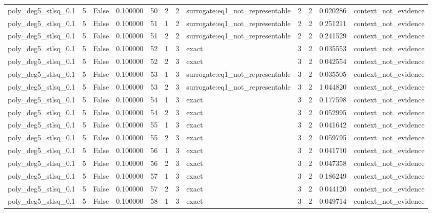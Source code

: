\begin{tabular}{lrrrrrrlrrrl}
poly\_deg5\_stlsq\_0.1 & 5 & False & 0.100000 & 50 & 2 & 2 & surrogate:eq1\_not\_representable & 2 & 2 & 0.020286 & context\_not\_evidence \\
poly\_deg5\_stlsq\_0.1 & 5 & False & 0.100000 & 51 & 1 & 2 & surrogate:eq1\_not\_representable & 2 & 2 & 0.251211 & context\_not\_evidence \\
poly\_deg5\_stlsq\_0.1 & 5 & False & 0.100000 & 51 & 2 & 2 & surrogate:eq1\_not\_representable & 2 & 2 & 0.241529 & context\_not\_evidence \\
poly\_deg5\_stlsq\_0.1 & 5 & False & 0.100000 & 52 & 1 & 3 & exact & 3 & 2 & 0.035553 & context\_not\_evidence \\
poly\_deg5\_stlsq\_0.1 & 5 & False & 0.100000 & 52 & 2 & 3 & exact & 3 & 2 & 0.042554 & context\_not\_evidence \\
poly\_deg5\_stlsq\_0.1 & 5 & False & 0.100000 & 53 & 1 & 3 & surrogate:eq1\_not\_representable & 3 & 2 & 0.035505 & context\_not\_evidence \\
poly\_deg5\_stlsq\_0.1 & 5 & False & 0.100000 & 53 & 2 & 3 & surrogate:eq1\_not\_representable & 3 & 2 & 1.044820 & context\_not\_evidence \\
poly\_deg5\_stlsq\_0.1 & 5 & False & 0.100000 & 54 & 1 & 3 & exact & 3 & 2 & 0.177598 & context\_not\_evidence \\
poly\_deg5\_stlsq\_0.1 & 5 & False & 0.100000 & 54 & 2 & 3 & exact & 3 & 2 & 0.052995 & context\_not\_evidence \\
poly\_deg5\_stlsq\_0.1 & 5 & False & 0.100000 & 55 & 1 & 3 & exact & 3 & 2 & 0.041642 & context\_not\_evidence \\
poly\_deg5\_stlsq\_0.1 & 5 & False & 0.100000 & 55 & 2 & 3 & exact & 3 & 2 & 0.059795 & context\_not\_evidence \\
poly\_deg5\_stlsq\_0.1 & 5 & False & 0.100000 & 56 & 1 & 3 & exact & 3 & 2 & 0.041710 & context\_not\_evidence \\
poly\_deg5\_stlsq\_0.1 & 5 & False & 0.100000 & 56 & 2 & 3 & exact & 3 & 2 & 0.047358 & context\_not\_evidence \\
poly\_deg5\_stlsq\_0.1 & 5 & False & 0.100000 & 57 & 1 & 3 & exact & 3 & 2 & 0.186249 & context\_not\_evidence \\
poly\_deg5\_stlsq\_0.1 & 5 & False & 0.100000 & 57 & 2 & 3 & exact & 3 & 2 & 0.044120 & context\_not\_evidence \\
poly\_deg5\_stlsq\_0.1 & 5 & False & 0.100000 & 58 & 1 & 3 & exact & 3 & 2 & 0.049714 & context\_not\_evidence \\

\end{tabular}
